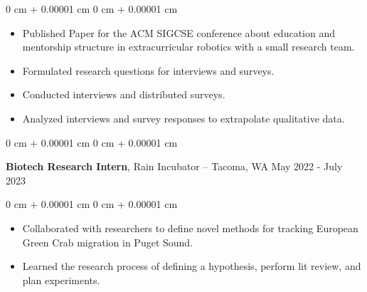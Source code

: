 \documentclass[10pt, article]{article}
\newenvironment{highlights}{
    \begin{itemize}[
        topsep=0.10 cm,
        parsep=0.10 cm,
        partopsep=0pt,
        itemsep=0pt,
        leftmargin=0 cm + 10pt
    ]
}{
    \end{itemize}
} %
\newenvironment{onecolentry}{
    \begin{adjustwidth}{
        0 cm + 0.00001 cm
    }{
        0 cm + 0.00001 cm
    }
}{
    \end{adjustwidth}
} %
\newenvironment{twocolentry}[2][]{
    \onecolentry
    \def\secondColumn{#2}
    \setcolumnwidth{\fill, 4.5 cm}
    \begin{paracol}{2}
}{
    \switchcolumn \raggedleft \secondColumn
    \end{paracol}
    \endonecolentry
} %
\begin{document}
        \vspace{0.20 cm}
        \begin{onecolentry}
            \begin{highlights}
              \item Published Paper for the ACM SIGCSE conference about education and mentorship structure in extracurricular robotics with a small research team.
              \item Formulated research questions for interviews and surveys.
              \item Conducted interviews and distributed surveys.
              \item Analyzed interviews and survey responses to extrapolate qualitative data.
            \end{highlights}
        \end{onecolentry}
        \vspace{0.2 cm}
        \begin{twocolentry}{ 
            May 2022 - July 2023

          }
        \textbf{Biotech Research Intern}, Rain Incubator -- Tacoma, WA\end{twocolentry}
        \vspace{0.2 cm}
        \begin{onecolentry}
          \begin{highlights}
          \item Collaborated with researchers to define novel methods for tracking European Green Crab migration in Puget Sound.
          \item Learned the research process of defining a hypothesis, perform lit review, and plan experiments.

          \end{highlights}
        \end{onecolentry}
\end{document}
